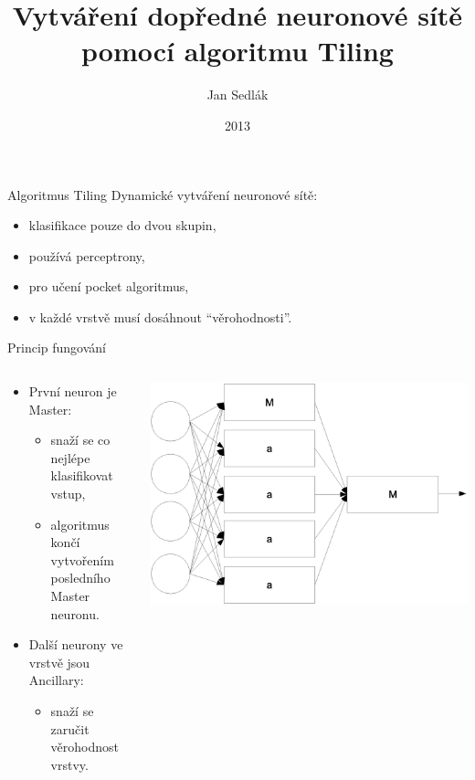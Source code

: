 \documentclass{beamer}
\title{Vytváření dopředné neuronové sítě pomocí algoritmu Tiling}
\institute{FIT VUT v Brně}
\author{Jan Sedlák}
\date{2013}
\begin{document}
\begin{frame}
  \maketitle
\end{frame}

\begin{frame}{Algoritmus Tiling}
  Dynamické vytváření neuronové sítě:
  \begin{itemize}
    \item klasifikace pouze do dvou skupin,
    \item používá perceptrony,
    \item pro učení pocket algoritmus,
    \item v každé vrstvě musí dosáhnout ``věrohodnosti''.
  \end{itemize}
\end{frame}

\begin{frame}{Princip fungování}
\begin{columns}
  \begin{column}{0.47\textwidth}
    \begin{itemize}
    \item První neuron je Master:
      \begin{itemize}
      \item snaží se co nejlépe klasifikovat vstup,
      \item algoritmus končí vytvořením posledního Master neuronu.
      \end{itemize}
    \item Další neurony ve vrstvě jsou Ancillary:
      \begin{itemize}
      \item snaží se zaručit věrohodnost vrstvy.
      \end{itemize}
    \end{itemize}
  \end{column}
  \begin{column}{0.5\textwidth}
    \includegraphics[width=\textwidth]{nn.eps}
  \end{column}
\end{columns}
\end{frame}
\end{document}
